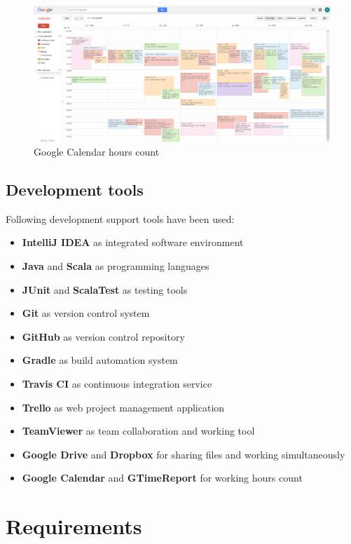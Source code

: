 \documentclass[a4paper,12pt]{report}
\begin{document}
\begin{figure}[ht]
\centering
\includegraphics[width=\textwidth]{figures/Calendar.png}
\caption{Google Calendar hours count}
\label{fig:Calendar}
\end{figure}

\section{Development tools}
Following development support tools have been used:

\begin{itemize}
\item \textbf{IntelliJ IDEA} as integrated software environment
\item \textbf{Java} and \textbf{Scala} as programming languages
\item \textbf{JUnit} and \textbf{ScalaTest} as testing tools
\item \textbf{Git} as version control system
\item \textbf{GitHub} as version control repository
\item \textbf{Gradle} as build automation system
\item \textbf{Travis CI} as continuous integration service
\item \textbf{Trello} as web project management application
\item \textbf{TeamViewer} as team collaboration and working tool
\item \textbf{Google Drive} and \textbf{Dropbox} for sharing files and working simultaneously
\item \textbf{Google Calendar} and \textbf{GTimeReport} for working hours count
\end{itemize}

\chapter{Requirements}
\end{document}

